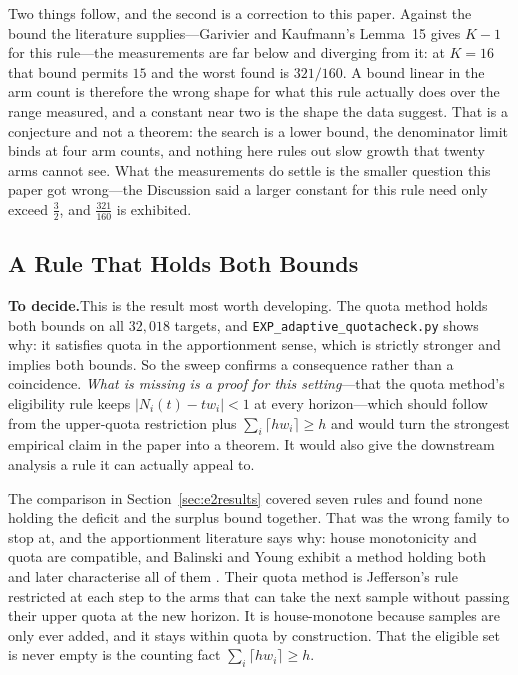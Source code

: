 \documentclass[conference]{IEEEtran}
\theoremstyle{definition}
\newif\ifshownotes\shownotestrue
\newcommand{\TODOPAR}[1]{\ifshownotes\par\vspace{2pt}\noindent%
  {\color{todocol}\textsf{\footnotesize\textbf{To decide.}\;#1}}\par\vspace{2pt}\fi}
\begin{document}
Two things follow, and the second is a correction to this paper. Against the bound the
literature supplies---Garivier and Kaufmann's Lemma~15 gives $K-1$ for this rule---the
measurements are far below and diverging from it: at $K=16$ that bound permits
$15$ and the worst found is $321/160$. A bound linear in the arm count is therefore
the wrong shape for what this rule actually does over the range measured, and a constant near
two is the shape the data suggest. That is a conjecture and not a theorem: the search is a
lower bound, the denominator limit binds at four arm counts, and nothing here rules out slow
growth that twenty arms cannot see. What the measurements do settle is the smaller question
this paper got wrong---the Discussion said a larger constant for this rule need only exceed
$\tfrac32$, and $\tfrac{321}{160}$ is exhibited.

\subsection{A Rule That Holds Both Bounds}
\label{sec:bny}
\TODOPAR{This is the result most worth developing. The quota method holds both bounds on
all $32{,}018$ targets, and \texttt{EXP\_adaptive\_quotacheck.py} shows why: it satisfies
quota in the apportionment sense, which is strictly stronger and implies both bounds. So the
sweep confirms a consequence rather than a coincidence. \emph{What is missing is a proof for
this setting}---that the quota method's eligibility rule keeps $|N_{i}(t)-tw_{i}|<1$ at every
horizon---which should follow from the upper-quota restriction plus $\sum_{i}\lceil
hw_{i}\rceil\ge h$ and would turn the strongest empirical claim in the paper into a theorem.
It would also give the downstream analysis a rule it can actually appeal to.}

The comparison in Section~\ref{sec:e2results} covered seven rules and found none holding the
deficit and the surplus bound together. That was the wrong family to stop at, and the
apportionment literature says why: house monotonicity and quota are compatible, and Balinski
and Young exhibit a method holding both \cite{balinski1975} and later characterise all of
them \cite{balinski1979}. Their quota method is Jefferson's rule restricted at each step to
the arms that can take the next sample without passing their upper quota at the new horizon.
It is house-monotone because samples are only ever added, and it stays within quota by
construction. That the eligible set is never empty is the counting fact
$\sum_{i}\lceil h w_{i}\rceil\ge h$.
\end{document}
